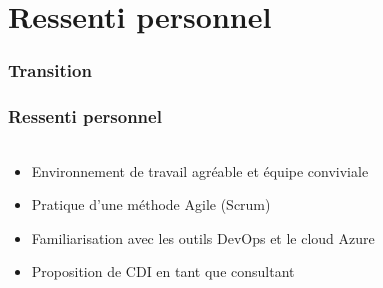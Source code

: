 \documentclass[aspectratio=169]{beamer}
\begin{document}
\section{Ressenti personnel}
\begin{frame}
    \frametitle{Transition}
    \framesubtitle{}
    \tableofcontents[currentsubsection,sectionstyle=show/shaded,subsectionstyle=show/shaded/hide]
\end{frame}
\begin{frame}
    \frametitle{Ressenti personnel}
    \framesubtitle{}
    \begin{columns}
        \begin{column}{.5\textwidth}
            \parbox[c][0.8\textheight][c]{\columnwidth}{
                \begin{center}
                    \begin{itemize}
                        \item<1->{Environnement de travail agréable et équipe conviviale}
                        \item<2->{Pratique d'une méthode Agile (Scrum)}
                        \item<3->{Familiarisation avec les outils DevOps et le cloud Azure}
                        \item<4->{Proposition de CDI en tant que consultant}
                    \end{itemize}
                \end{center}
            }
        \end{column}
        \begin{column}{.44\textwidth}
            \parbox[c][0.8\textheight][c]{\columnwidth}{
                \begin{center}

\end{center}}
\end{column}
\end{columns}
\end{frame}
\end{document}
